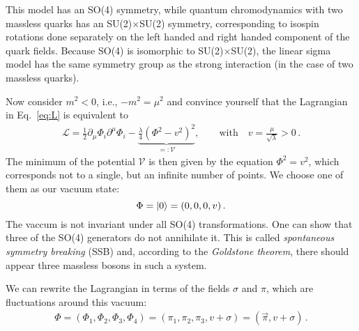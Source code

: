 \documentclass[11pt]{latex/exercise}
\begin{document}
This model has an SO(4) symmetry, while quantum chromodynamics with two massless quarks has an SU(2)$\times$SU(2) symmetry, corresponding to isospin rotations done separately on the left handed and right handed component of the quark fields. Because SO(4) is isomorphic to SU(2)$\times$SU(2), the linear sigma model has the same symmetry group as the strong interaction (in the case of two massless quarks).


Now consider $m^2<0$, i.e., $-m^2=\mu^2$ and convince yourself that the Lagrangian in Eq.~\eqref{eq:L} is equivalent to
\begin{eqnarray}
    \mathcal{L} = \frac12 \partial_{\mu} \Phi_i \partial^{\mu} \Phi_i
    - \underbrace{\frac{\lambda}{4} {\left( \Phi^2 - v^2 \right)}^2}_{\displaystyle =: \mathcal V},
    \qquad \text{with} \quad v=\frac{\mu}{\sqrt{\lambda}}>0 \,.
    \label{eq:Lwithv}
\end{eqnarray}
The minimum of the potential $\mathcal V$ is then given by the equation $\Phi^2 = v^2$,
which corresponds not to a single, but an infinite number of points.
We choose one of them as our vacuum state:
\begin{equation}
    \Phi
    =\ket{0}
    = (0,0,0,v)\,.
    \label{eq:vacuum}
\end{equation}
The vaccum is not invariant under all SO(4) transformations. One can show that three of the SO(4) generators do not annihilate it. This is called \emph{spontaneous symmetry breaking} (SSB) and, according to the \emph{Goldstone theorem}, there should appear three massless bosons in such a system.

We can rewrite the Lagrangian in terms of the fields $\sigma$ and $\pi$, which are fluctuations around this vacuum:
\begin{eqnarray}
    \Phi = (\Phi_1, \Phi_2, \Phi_3, \Phi_4)
    = (\pi_1, \pi_2, \pi_3,v + \sigma) = (\vec{\pi}, v+\sigma)\,.
\end{eqnarray}
\end{document}
